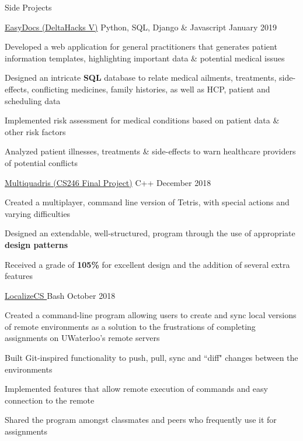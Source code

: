 \documentclass{resume} %
\begin{document}
\begin{rSection}{Side Projects}
    
    \begin{sideproject}
        {\href{https://github.com/wbhildeb/EasyDocs}{\faGithub{} EasyDocs (DeltaHacks V)}}
        {Python, SQL, Django \& Javascript}
        {January 2019}
        {
            \item Developed a web application for general practitioners that generates patient information templates, highlighting important data \& potential medical issues
            \item Designed an intricate \textbf{SQL} database to relate medical ailments, treatments, side-effects, conflicting medicines, family histories, as well as HCP, patient and scheduling data
            \item Implemented risk assessment for medical conditions based on patient data \& other risk factors
            \item Analyzed patient illnesses, treatments \& side-effects to warn healthcare providers of potential conflicts
        }
    \end{sideproject}

    \vspace{1em}

    \begin{sideproject}
        {\href{https://github.com/wbhildeb/Multiquadris}{\faGithub{} Multiquadris (CS246 Final Project)}}
        {C++}
        {December 2018}
        {
            \item Created a multiplayer, command line version of Tetris, with special actions and varying difficulties
            \item Designed an extendable, well-structured, program through the use of appropriate \textbf{design patterns}
            \item Received a grade of \textbf{105\%} for excellent design and the addition of several extra features
        }
    \end{sideproject}
    
    \vspace{1em}

    \begin{sideproject}
        {\href{https://github.com/wbhildeb/localize-cs}{\faGithub{} LocalizeCS }}
        {Bash}
        {October 2018}
        {
            \item Created a command-line program allowing users to create and sync local versions of remote environments as
            a solution to the frustrations of completing assignments on UWaterloo's remote servers
            \item Built Git-inspired functionality to push, pull, sync and ``diff" changes between the environments
            \item Implemented features that allow remote execution of commands and easy connection to the remote
            \item Shared the program amongst classmates and peers who frequently use it for assignments
        }
    \end{sideproject}
    

\end{rSection}
\end{document}
